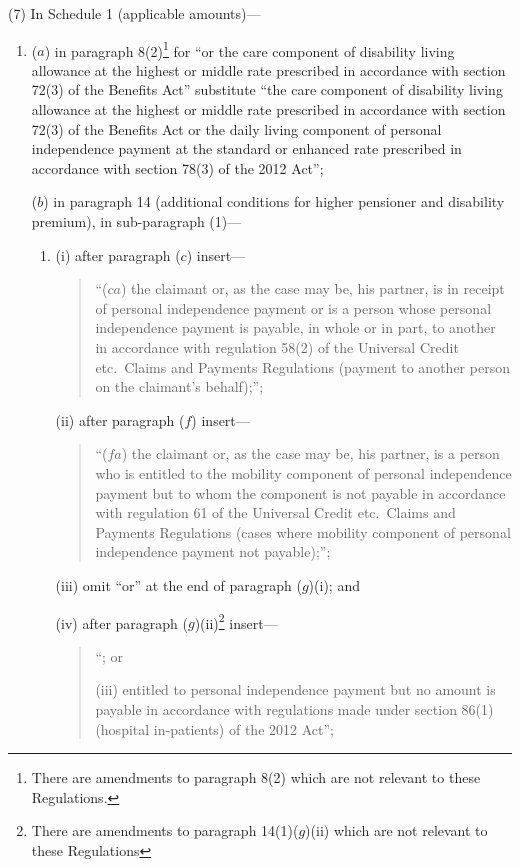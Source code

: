 \documentclass[12pt,a4paper]{article}
\begin{document}
(7) In Schedule 1 (applicable amounts)—
\begin{enumerate}\item[]
($a$) in paragraph 8(2)\footnote{There are amendments to paragraph 8(2) which are not relevant to these Regulations.} for “or the care component of disability living allowance at the highest or middle rate prescribed in accordance with section 72(3) of the Benefits Act” substitute “the care component of disability living allowance at the highest or middle rate prescribed in accordance with section 72(3) of the Benefits Act or the daily living component of personal independence payment at the standard or enhanced rate prescribed in accordance with section 78(3) of the 2012 Act”;

($b$) in paragraph 14 (additional conditions for higher pensioner and disability premium), in sub-paragraph (1)—
\begin{enumerate}\item[]
(i) after paragraph ($c$)  insert—
\begin{quotation}
“($ca$) the claimant or, as the case may be, his partner, is in receipt of personal independence payment or is a person whose personal independence payment is payable, in whole or in part, to another in accordance with regulation 58(2) of the Universal Credit etc.\ Claims and Payments Regulations (payment to another person on the claimant’s behalf);”;
\end{quotation}

(ii) after paragraph ($f$)  insert—
\begin{quotation}
“($fa$) the claimant or, as the case may be, his partner, is a person who is entitled to the mobility component of personal independence payment but to whom the component is not payable in accordance with regulation 61 of the Universal Credit etc.\ Claims and Payments Regulations (cases where mobility component of personal independence payment not payable);”;
\end{quotation}

(iii) omit “or” at the end of paragraph ($g$)(i); and

(iv) after paragraph ($g$)(ii)\footnote{There are amendments to paragraph 14(1)($g$)(ii)  which are not relevant to these Regulations} insert—
\begin{quotation}
“; or

(iii) entitled to personal independence payment but no amount is payable in accordance with regulations made under section 86(1) (hospital in-patients) of the 2012 Act”;
\end{quotation}
\end{enumerate}


\end{enumerate}
\end{document}
